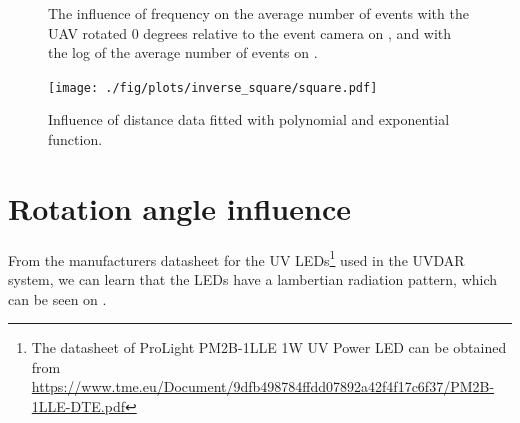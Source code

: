 \begin{figure}[htbp]
	\centering
	\caption{
  The influence of frequency on the average number of events with the UAV rotated 0 degrees relative to the event camera on , and with the log of the average number of events on .
  }
	\label{fig:freqs}
\end{figure}

\begin{figure}[htbp]
	\centering
	\texttt{[image: ./fig/plots/inverse\_square/square.pdf]}
	\caption{Influence of distance data fitted with polynomial and exponential function.}
	\label{fig:fit1}
  \end{figure}

\newpage

\section{Rotation angle influence}

From the manufacturers datasheet for the UV LEDs\footnote{The datasheet of ProLight PM2B-1LLE 1W UV Power LED can be obtained from \url{https://www.tme.eu/Document/9dfb498784ffdd07892a42f4f17c6f37/PM2B-1LLE-DTE.pdf}}
used in the UVDAR system, we can learn that the LEDs have a lambertian radiation pattern,
which can be seen on .

